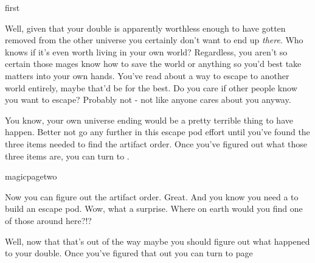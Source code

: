 \documentclass[greennotebook]{guildcamp3} %
\begin{document}
\startnotebook{\nEscapePodMagic{}}


\begin{page}{first}

Well, given that your double is apparently worthless enough to have gotten removed from the other universe you certainly don't want to end up \emph{there}. Who knows if it's even worth living in your own world? Regardless, you aren't so certain those mages know how to save the world or anything so you'd best take matters into your own hands. You've read about a way to escape to another world entirely, maybe that'd be for the best. Do you care if other people know you want to escape? Probably not - not like anyone cares about you anyway.

You know, your own universe ending would be a pretty terrible thing to have happen. Better not go any further in this escape pod effort until you've found the three items needed to find the artifact order. Once you've figured out what those three items are, you can turn to .
\end{page}



\begin{page}{magicpagetwo}

Now you can figure out the artifact order. Great. And you know you need a \iSalamander{} to build an escape pod. Wow, what a surprise. Where on earth would you find one of those around here?!?

Well, now that that's out of the way maybe you should figure out what happened to your double. Once you've figured that out you can turn to page 

\end{page}
\end{document}
